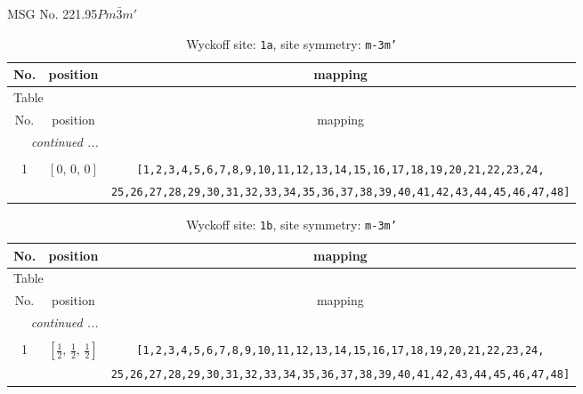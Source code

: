 \documentclass[fleqn,8pt]{jsarticle}
\begin{document}
\setcounter{MaxMatrixCols}{32}

\renewcommand{\tablename}{Table~}
\renewcommand{\figurename}{Figure~}
\begin{center}
\LARGE
MSG No. 221.95\quad$Pm\bar{3}m'$
\end{center}
\renewcommand{\arraystretch}{1.2}
\begin{longtable}{ccc}
\caption{Wyckoff site: {\tt 1a}, site symmetry: {\tt m-3m'}}
 \\
 \hline \hline
No. & position & mapping \\ \hline \endfirsthead

\multicolumn{2}{l}{\tablename\ \thetable{}} \\
 \hline \hline
No. & position & mapping \\ \hline \endhead

 \hline \hline
\multicolumn{2}{r}{\footnotesize\it continued ...} \\ \endfoot

 \hline \hline
\multicolumn{2}{r}{} \\ \endlastfoot

1 & $\left[ 0,\, 0,\, 0 \right]$ & {\tt [1,2,3,4,5,6,7,8,9,10,11,12,13,14,15,16,17,18,19,20,21,22,23,24,} \\ \hline
 &  & {\tt 25,26,27,28,29,30,31,32,33,34,35,36,37,38,39,40,41,42,43,44,45,46,47,48]} \\
\end{longtable}
\renewcommand{\arraystretch}{1.2}
\begin{longtable}{ccc}
\caption{Wyckoff site: {\tt 1b}, site symmetry: {\tt m-3m'}}
 \\
 \hline \hline
No. & position & mapping \\ \hline \endfirsthead

\multicolumn{2}{l}{\tablename\ \thetable{}} \\
 \hline \hline
No. & position & mapping \\ \hline \endhead

 \hline \hline
\multicolumn{2}{r}{\footnotesize\it continued ...} \\ \endfoot

 \hline \hline
\multicolumn{2}{r}{} \\ \endlastfoot

1 & $\left[ \frac{1}{2},\, \frac{1}{2},\, \frac{1}{2} \right]$ & {\tt [1,2,3,4,5,6,7,8,9,10,11,12,13,14,15,16,17,18,19,20,21,22,23,24,} \\ \hline
 &  & {\tt 25,26,27,28,29,30,31,32,33,34,35,36,37,38,39,40,41,42,43,44,45,46,47,48]} \\
\end{longtable}
\end{document}
